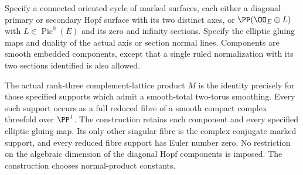 
\begin{proposition}\label{cdp:st:C.2.UN.57}
Specify a connected oriented cycle of marked surfaces, each either a
diagonal primary or secondary Hopf surface with its two distinct axes,
or $\PP(\OO_E\oplus L)$ with $L\in\operatorname{Pic}^0(E)$ and its
zero and infinity sections. Specify the elliptic gluing maps and
duality of the actual axis or section normal lines. Components are
smooth embedded components, except that a single ruled normalization
with its two sections identified is also allowed.

The actual rank-three complement-lattice product $M$ is the identity
precisely for those specified supports which admit a smooth-total
two-torus smoothing. Every such support occurs as a full reduced fibre
of a smooth compact complex threefold over $\PP^1$. The construction
retains each component and every specified elliptic gluing map. Its
only other singular fibre is the complex conjugate marked support,
and every reduced fibre support has Euler number zero. No restriction
on the algebraic dimension of the diagonal Hopf components is imposed.
The construction chooses normal-product constants.
\end{proposition}

